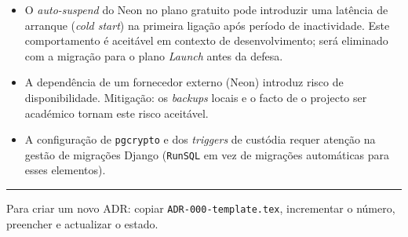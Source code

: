 \documentclass[a4paper,11pt]{article}
\begin{document}
\begin{itemize}[nosep, leftmargin=*]
    \item O \emph{auto-suspend} do Neon no plano gratuito pode introduzir uma
    latência de arranque (\emph{cold start}) na primeira ligação após período
    de inactividade. Este comportamento é aceitável em contexto de
    desenvolvimento; será eliminado com a migração para o plano \emph{Launch}
    antes da defesa.

    \item A dependência de um fornecedor externo (Neon) introduz risco de
    disponibilidade. Mitigação: os \emph{backups} locais e o facto de o
    projecto ser académico tornam este risco aceitável.

    \item A configuração de \texttt{pgcrypto} e dos \emph{triggers} de
    custódia requer atenção na gestão de migrações Django
    (\texttt{RunSQL} em vez de migrações automáticas para esses elementos).
\end{itemize}

\vspace{2em}
\hrule
\vspace{0.5em}
{\small Para criar um novo ADR: copiar \texttt{ADR-000-template.tex},
incrementar o número, preencher e actualizar o estado.}
\end{document}
